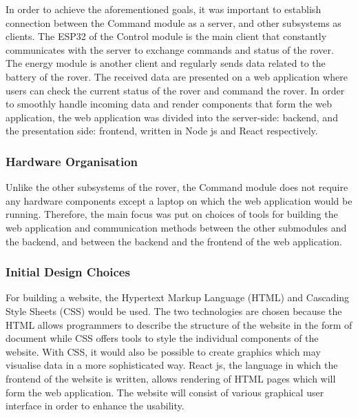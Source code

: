 \documentclass[a4paper]{article}
\begin{document}
In order to achieve the aforementioned goals, it was important to establish 
connection between the Command module as a server, and other subsystems as 
clients. The ESP32 of the Control module is the main client that constantly 
communicates with the server to exchange commands and status of the rover. 
The energy module is another client and regularly sends data related to the 
battery of the rover. The received data are presented on a web application 
where users can check the current status of the rover and command the rover. 
In order to smoothly handle incoming data and render components that form the 
web application, the web application was divided into the server-side: backend, 
and the presentation side: frontend, written in Node js and React respectively.

\subsubsection{Hardware Organisation}

Unlike the other subsystems of the rover, the Command module does not require any 
hardware components except a laptop on which the web application would be running. 
Therefore, the main focus was put on choices of tools for building the web application 
and communication methods between the other submodules and the backend, and between the 
backend and the frontend of the web application. 

\subsubsection{Initial Design Choices}

For building a website, the Hypertext Markup Language (HTML) and Cascading Style Sheets (CSS) would 
be used. The two technologies are chosen because the HTML allows programmers to describe the structure 
of the website in the form of document while CSS offers tools to style the individual components of 
the website. With CSS, it would also be possible to create graphics which may visualise data in a more 
sophisticated way. React js, the language in which the frontend of the website is written, allows rendering 
of HTML pages which will form the web application. The website will consist of various graphical user 
interface in order to enhance the usability. 
\end{document}
